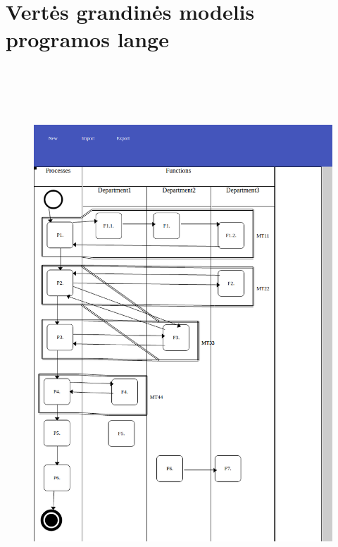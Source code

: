 \documentclass{VUMIFInfBakalaurinis}
\begin{document}
\section{Vertės grandinės modelis programos lange} \label{appendix:dvcm_window}
\begin{figure}[H]
    \centering
    \includegraphics[height=20cm]{img/dvcm_window}
\end{figure}
\end{document}
